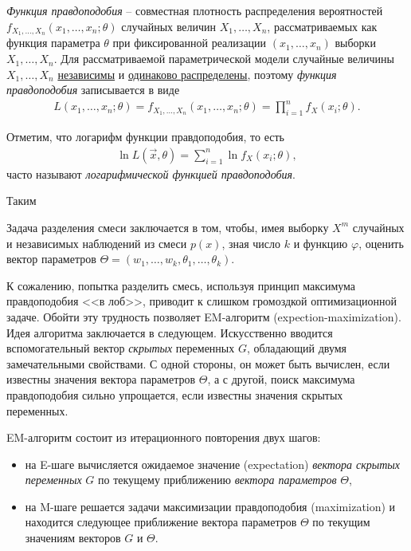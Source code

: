 \documentclass[%
	11pt,
	a4paper,
	utf8,
		]{article}
\begin{document}
\emph{Функция правдоподобия} -- совместная плотность распределения вероятностей $ f_{X_1, \ldots, X_n}(x_1, \ldots, x_n; \theta) $ случайных величин $ X_1, \ldots, X_n $, рассматриваемых как функция параметра $ \theta $ при фиксированной реализации $ (x_1, \ldots, x_n) $ выборки $ X_1, \ldots, X_n $. Для рассматриваемой параметрической модели случайные величины $ X_1, \ldots, X_n $ \underline{независимы} и \underline{одинаково распределены}, поэтому \emph{функция правдоподобия} записывается в виде \cite{shulenin-ch1}
\begin{align*}
	L(x_1, \ldots, x_n; \theta) = f_{X_1, \ldots, X_n}(x_1, \ldots, x_n; \theta) = \prod_{i=1}^{n} f_X(x_i; \theta).
\end{align*}

Отметим, что логарифм функции правдоподобия, то есть
\begin{align*}
	\ln L(\vec{x}, \theta) = \sum_{i=1}^{n} \ln f_X(x_i; \theta),
\end{align*}
часто называют \emph{логарифмической функцией правдоподобия}.

Таким 

Задача разделения смеси заключается в том, чтобы, имея выборку $ X^m $ случайных и независимых наблюдений из смеси $ p(x) $, зная число $ k $ и функцию $ \varphi $, оценить вектор параметров $ \Theta = (w_1, \ldots, w_k, \theta_1, \ldots, \theta_k) $.

К сожалению, попытка разделить смесь, используя принцип максимума правдоподобия <<в лоб>>, приводит к слишком громоздкой оптимизационной задаче. Обойти эту трудность позволяет EM-алгоритм (expection-maximization). Идея алгоритма заключается в следующем. Искусственно вводится вспомогательный вектор \emph{скрытых} переменных $ G $, обладающий двумя замечательными свойствами. С одной стороны, он может быть вычислен, если известны значения вектора параметров $ \Theta $, а с другой, поиск максимума правдоподобия сильно упрощается, если известны значения скрытых переменных.

EM-алгоритм состоит из итерационного повторения двух шагов:
\begin{itemize}
	\item на E-шаге вычисляется ожидаемое значение (expectation) \emph{вектора скрытых переменных} $ G $ по текущему приближению \emph{вектора параметров} $ \Theta $,
	
	\item на M-шаге решается задачи максимизации правдоподобия (maximization) и находится следующее приближение вектора параметров $ \Theta $ по текущим значениям векторов $ G $ и $ \Theta $.
\end{itemize} 
\end{document}
